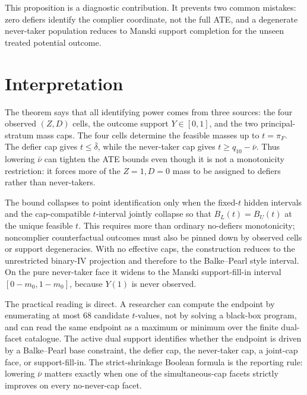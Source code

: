 \documentclass[11pt]{article}
\theoremstyle{definition}
\theoremstyle{plain}
\theoremstyle{remark}
\begin{document}
This proposition is a diagnostic contribution.  It prevents two common mistakes:
zero defiers identify the complier coordinate, not the full ATE, and a
degenerate never-taker population reduces to Manski support completion for the
unseen treated potential outcome.

\section{Interpretation}
The theorem says that all identifying power comes from three sources: the four
observed \((Z,D)\) cells, the outcome support \(Y\in[0,1]\), and the two
principal-stratum mass caps.  The four cells determine the feasible masses up
to \(t=\pi_F\).  The defier cap gives \(t\le\bar\delta\), while the never-taker
cap gives \(t\ge q_{10}-\bar\nu\).  Thus lowering \(\bar\nu\) can tighten the
ATE bounds even though it is not a monotonicity restriction: it forces more of
the \(Z=1,D=0\) mass to be assigned to defiers rather than never-takers.

The bound collapses to point identification only when the fixed-\(t\) hidden
intervals and the cap-compatible \(t\)-interval jointly collapse so that
\(B_L(t)=B_U(t)\) at the unique feasible \(t\).  This requires more than
ordinary no-defiers monotonicity; noncomplier counterfactual outcomes must also
be pinned down by observed cells or support degeneracies.  With no effective
caps, the construction reduces to the unrestricted binary-IV projection and
therefore to the Balke--Pearl style interval.  On the pure never-taker face it
widens to the Manski support-fill-in interval \([0-m_0,1-m_0]\), because
\(Y(1)\) is never observed.

The practical reading is direct.  A researcher can compute the endpoint by
enumerating at most 68 candidate \(t\)-values, not by solving a black-box
program, and can read the same endpoint as a maximum or minimum over the
finite dual-facet catalogue.  The active dual support identifies whether the
endpoint is driven by a Balke--Pearl base constraint, the defier cap, the
never-taker cap, a joint-cap face, or support-fill-in.  The strict-shrinkage
Boolean formula is the reporting rule: lowering \(\bar\nu\) matters exactly
when one of the simultaneous-cap facets strictly improves on every
no-never-cap facet.
\end{document}
